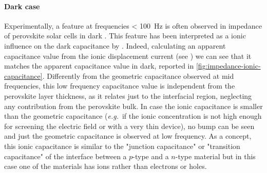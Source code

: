 	\paragraph{Dark case}\label{impedance_lowf_dark}
	Experimentally, a feature at frequencies \SI{< 100}{\Hz} is often observed in impedance of perovskite solar cells in dark \cite{Pockett2015,Juarez-Perez2014,Kim2015c,Guerrero2016,Zarazua2016}.
	This feature has been interpreted as a ionic influence on the dark capacitance by .
	Indeed, calculating an apparent capacitance value from the ionic displacement current (see ) we can see that it matches the apparent capacitance value in dark, reported in \cref{fig:impedance-ionic-capacitance}.
	Differently from the geometric capacitance observed at mid frequencies, this low frequency capacitance value is independent from the perovskite layer thickness, as it relates just to the interfacial region, neglecting any contribution from the perovskite bulk.
	In case the ionic capacitance is smaller than the geometric capacitance (\textsl{e.g.}\ if the ionic concentration is not high enough for screening the electric field or with a very thin device), no bump can be seen and just the geometric capacitance is observed at low frequency.
	As a concept, this ionic capacitance is similar to the "junction capacitance" or "transition capacitance" of the interface between a $p$-type and a $n$-type material but in this case one of the materials has ions rather than electrons or holes.


\begin{figure}%
\end{figure}



